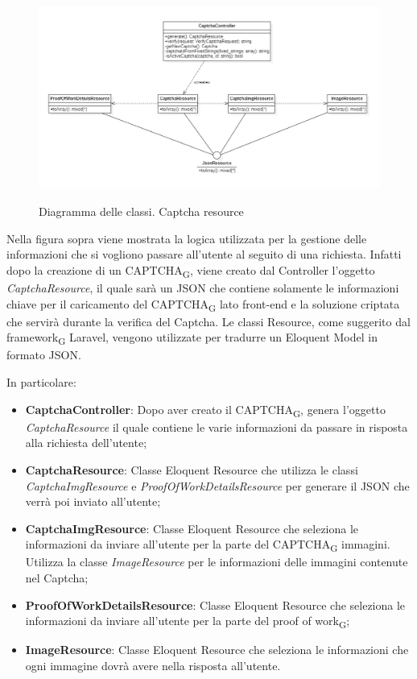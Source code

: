 \begin{figure}[H]
	\centering
	\includegraphics[scale = 0.6]{img/captcha_resource.png}\\
	\caption{Diagramma delle classi. Captcha resource}
\end{figure}

Nella figura sopra viene mostrata la logica utilizzata per la gestione delle informazioni che si vogliono passare all'utente al seguito di una richiesta. Infatti dopo la creazione di un CAPTCHA\textsubscript{G}, viene creato dal Controller l'oggetto \textit{CaptchaResource}, il quale sarà un JSON che contiene solamente le informazioni chiave per il caricamento del CAPTCHA\textsubscript{G} lato front-end e la soluzione criptata che servirà durante la verifica del Captcha. Le classi Resource, come suggerito dal framework\textsubscript{G} Laravel, vengono utilizzate per tradurre un Eloquent Model in formato JSON.

In particolare:
\begin{itemize}
	\item \textbf{CaptchaController}: Dopo aver creato il CAPTCHA\textsubscript{G}, genera l'oggetto \textit{CaptchaResource} il quale contiene le varie informazioni da passare in risposta alla richiesta dell'utente;
	\item \textbf{CaptchaResource}: Classe Eloquent Resource che utilizza le classi \textit{CaptchaImgResource} e \textit{ProofOfWorkDetailsResource} per generare il JSON che verrà poi inviato all'utente;
	\item \textbf{CaptchaImgResource}: Classe Eloquent Resource che seleziona le informazioni da inviare all'utente per la parte del CAPTCHA\textsubscript{G} immagini. Utilizza la classe \textit{ImageResource} per le informazioni delle immagini contenute nel Captcha;
	\item \textbf{ProofOfWorkDetailsResource}: Classe Eloquent Resource che seleziona le informazioni da inviare all'utente per la parte del proof of work\textsubscript{G};
	\item \textbf{ImageResource}: Classe Eloquent Resource che seleziona le informazioni che ogni immagine dovrà avere nella risposta all'utente.
\end{itemize}
\newpage

